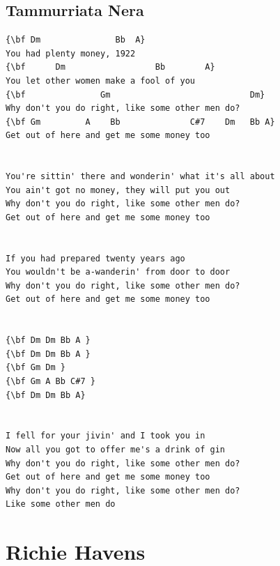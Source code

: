 \documentclass[a4paper]{article}
\begin{document}
\subsection{Tammurriata Nera}
\begin{Verbatim}[commandchars=\\\{\}]
{\bf Dm               Bb  A}
You had plenty money, 1922 
{\bf      Dm                  Bb        A}
You let other women make a fool of you 
{\bf               Gm                            Dm}
Why don't you do right, like some other men do? 
{\bf Gm         A    Bb              C#7    Dm   Bb A}
Get out of here and get me some money too 


You're sittin' there and wonderin' what it's all about 
You ain't got no money, they will put you out 
Why don't you do right, like some other men do? 
Get out of here and get me some money too 


If you had prepared twenty years ago 
You wouldn't be a-wanderin' from door to door 
Why don't you do right, like some other men do? 
Get out of here and get me some money too 


{\bf Dm Dm Bb A }
{\bf Dm Dm Bb A }
{\bf Gm Dm }
{\bf Gm A Bb C#7 }
{\bf Dm Dm Bb A}


I fell for your jivin' and I took you in 
Now all you got to offer me's a drink of gin 
Why don't you do right, like some other men do? 
Get out of here and get me some money too 
Why don't you do right, like some other men do? 
Like some other men do

\end{Verbatim}
\newpage
\section{Richie Havens}
\end{document}
